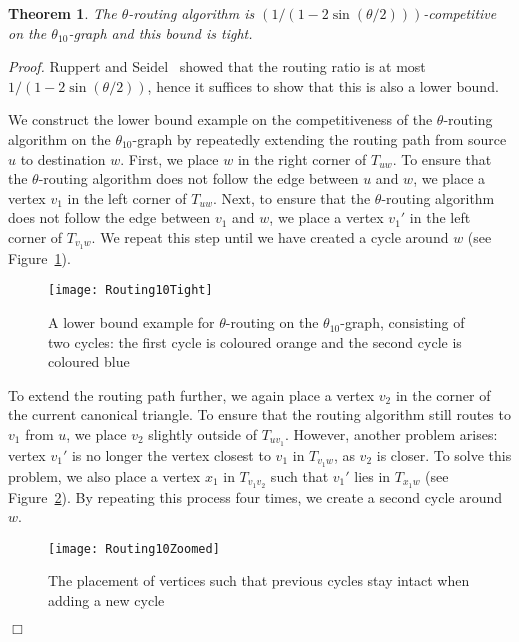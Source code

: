 \documentclass[12pt]{article}
\newtheorem{theo}[defin]{Theorem}
\newenvironment{theorem}{\begin{theo} \sl}{\end{theo}}
\newenvironment{proof}{\emph{Proof.}}{\hfill $\Box$\\}
\newcommand{\canon}[2]{\ensuremath{T_{#1 #2}}}
\begin{document}
\begin{theorem}
  The $\theta$-routing algorithm is $\left( 1 / \left(1 - 2 \sin \left( \theta/2 \right) \right) \right)$-competitive on the $\theta_{10}$-graph and this bound is tight. 
\end{theorem}
\begin{proof}
  Ruppert and Seidel~\cite{RS91} showed that the routing ratio is at most $1/(1 - 2 \sin (\theta/2))$, hence it suffices to show that this is also a lower bound. 

  We construct the lower bound example on the competitiveness of the $\theta$-routing algorithm on the $\theta_{10}$-graph by repeatedly extending the routing path from source $u$ to destination $w$. First, we place $w$ in the right corner of \canon{u}{w}. To ensure that the $\theta$-routing algorithm does not follow the edge between $u$ and $w$, we place a vertex $v_1$ in the left corner of \canon{u}{w}. Next, to ensure that the $\theta$-routing algorithm does not follow the edge between $v_1$ and $w$, we place a vertex $v_1'$ in the left corner of \canon{v_1}{w}. We repeat this step until we have created a cycle around $w$ (see Figure~\ref{fig:Routing10Tight}). 

  \begin{figure}[ht]
    \centering
    \texttt{[image: Routing10Tight]}
    \caption{A lower bound example for $\theta$-routing on the $\theta_{10}$-graph, consisting of two cycles: the first cycle is coloured orange and the second cycle is coloured blue}
    \label{fig:Routing10Tight}
  \end{figure}

  To extend the routing path further, we again place a vertex $v_2$ in the corner of the current canonical triangle. To ensure that the routing algorithm still routes to $v_1$ from $u$, we place $v_2$ slightly outside of \canon{u}{v_1}. However, another problem arises: vertex $v_1'$ is no longer the vertex closest to $v_1$ in \canon{v_1}{w}, as $v_2$ is closer. To solve this problem, we also place a vertex $x_1$ in \canon{v_1}{v_2} such that $v_1'$ lies in \canon{x_1}{w} (see Figure~\ref{fig:Routing10Zoomed}). By repeating this process four times, we create a second cycle around $w$. 

  \begin{figure}[ht]
    \centering
    \texttt{[image: Routing10Zoomed]}
    \caption{The placement of vertices such that previous cycles stay intact when adding a new cycle}
    \label{fig:Routing10Zoomed}
  \end{figure}


\end{proof}
\end{document}
